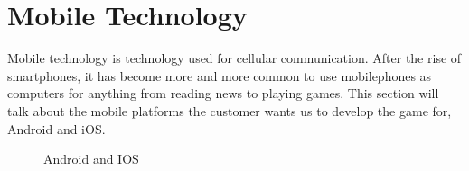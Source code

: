 \section{Mobile Technology}

Mobile technology is technology used for cellular communication. \cite{mobileTechnology} After the
rise of smartphones, it has become more and more common to use mobilephones as computers for
anything from reading news to playing games. This section will talk about the mobile platforms the
customer wants us to develop the game for, Android and iOS.

\begin{figure}[!ht]
    \centering
    \caption{Android and IOS}
\end{figure}


